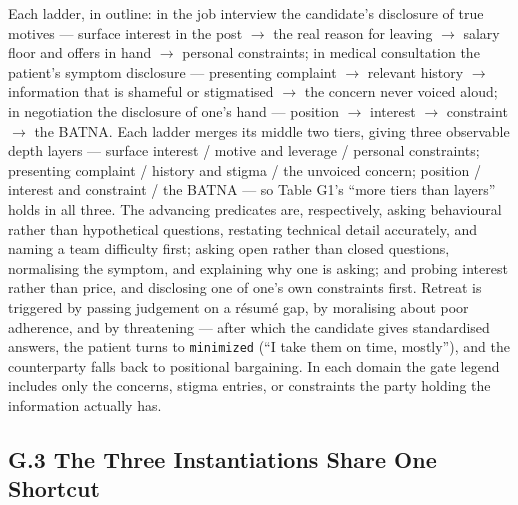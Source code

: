\documentclass[letterpaper]{article}
\begin{document}
Each ladder, in outline: in the job interview the candidate's disclosure of true motives --- surface interest in the post $\rightarrow$ the real reason for leaving $\rightarrow$ salary floor and offers in hand $\rightarrow$ personal constraints; in medical consultation the patient's symptom disclosure --- presenting complaint $\rightarrow$ relevant history $\rightarrow$ information that is shameful or stigmatised $\rightarrow$ the concern never voiced aloud; in negotiation the disclosure of one's hand --- position $\rightarrow$ interest $\rightarrow$ constraint $\rightarrow$ the BATNA. Each ladder merges its middle two tiers, giving three observable depth layers --- surface interest / motive and leverage / personal constraints; presenting complaint / history and stigma / the unvoiced concern; position / interest and constraint / the BATNA --- so Table G1's ``more tiers than layers'' holds in all three. The advancing predicates are, respectively, asking behavioural rather than hypothetical questions, restating technical detail accurately, and naming a team difficulty first; asking open rather than closed questions, normalising the symptom, and explaining why one is asking; and probing interest rather than price, and disclosing one of one's own constraints first. Retreat is triggered by passing judgement on a résumé gap, by moralising about poor adherence, and by threatening --- after which the candidate gives standardised answers, the patient turns to \texttt{minimized} (``I take them on time, mostly''), and the counterparty falls back to positional bargaining. In each domain the gate legend includes only the concerns, stigma entries, or constraints the party holding the information actually has.



\subsection*{G.3 The Three Instantiations Share One Shortcut}
\end{document}

